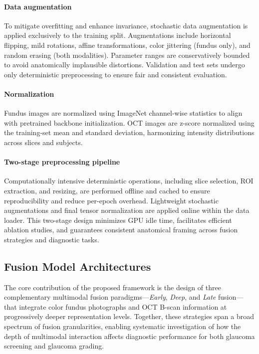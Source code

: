 \documentclass[preprint,12pt]{elsarticle}
\begin{document}
\paragraph{Data augmentation}
To mitigate overfitting and enhance invariance, stochastic data augmentation is applied exclusively to the training split. Augmentations include horizontal flipping, mild rotations, affine transformations, color jittering (fundus only), and random erasing (both modalities). Parameter ranges are conservatively bounded to avoid anatomically implausible distortions. Validation and test sets undergo only deterministic preprocessing to ensure fair and consistent evaluation.

\paragraph{Normalization}
Fundus images are normalized using ImageNet channel-wise statistics to align with pretrained backbone initialization. OCT images are z-score normalized using the training-set mean and standard deviation, harmonizing intensity distributions across slices and subjects.

\paragraph{Two-stage preprocessing pipeline}
Computationally intensive deterministic operations, including slice selection, ROI extraction, and resizing, are performed offline and cached to ensure reproducibility and reduce per-epoch overhead. Lightweight stochastic augmentations and final tensor normalization are applied online within the data loader. This two-stage design minimizes GPU idle time, facilitates efficient ablation studies, and guarantees consistent anatomical framing across fusion strategies and diagnostic tasks.


\subsection{Fusion Model Architectures}
\label{subsec34}

The core contribution of the proposed framework is the design of three complementary multimodal fusion paradigms—\textit{Early}, \textit{Deep}, and \textit{Late} fusion—that integrate color fundus photographs and OCT B-scan information at progressively deeper representation levels. Together, these strategies span a broad spectrum of fusion granularities, enabling systematic investigation of how the depth of multimodal interaction affects diagnostic performance for both glaucoma screening and glaucoma grading.
\end{document}
